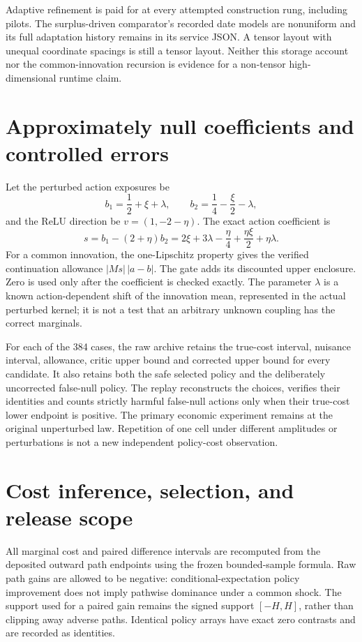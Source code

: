 Adaptive refinement is paid for at every attempted construction rung, including pilots. The surplus-driven comparator's recorded date models are nonuniform and its full adaptation history remains in its service JSON. A tensor layout with unequal coordinate spacings is still a tensor layout. Neither this storage account nor the common-innovation recursion is evidence for a non-tensor high-dimensional runtime claim.

\section{Approximately null coefficients and controlled errors}\label{supp:nonnull54}
Let the perturbed action exposures be
\[
 b_1=\frac12+\xi+\lambda,\qquad
 b_2=\frac14-\frac{\xi}{2}-\lambda,
\]
and the ReLU direction be $v=(1,-2-\eta)$. The exact action coefficient is
\[
 s=b_1-(2+\eta)b_2
   =2\xi+3\lambda-\frac{\eta}{4}
       +\frac{\eta\xi}{2}+\eta\lambda.
\]
For a common innovation, the one-Lipschitz property gives the verified continuation allowance $|Ms|\,|a-b|$. The gate adds its discounted upper enclosure. Zero is used only after the coefficient is checked exactly. The parameter $\lambda$ is a known action-dependent shift of the innovation mean, represented in the actual perturbed kernel; it is not a test that an arbitrary unknown coupling has the correct marginals.

For each of the 384 cases, the raw archive retains the true-cost interval, nuisance interval, allowance, critic upper bound and corrected upper bound for every candidate. It also retains both the safe selected policy and the deliberately uncorrected false-null policy. The replay reconstructs the choices, verifies their identities and counts strictly harmful false-null actions only when their true-cost lower endpoint is positive. The primary economic experiment remains at the original unperturbed law. Repetition of one cell under different amplitudes or perturbations is not a new independent policy-cost observation.

\section{Cost inference, selection, and release scope}\label{supp:inference54}
All marginal cost and paired difference intervals are recomputed from the deposited outward path endpoints using the frozen bounded-sample formula. Raw path gains are allowed to be negative: conditional-expectation policy improvement does not imply pathwise dominance under a common shock. The support used for a paired gain remains the signed support $[-H,H]$, rather than clipping away adverse paths. Identical policy arrays have exact zero contrasts and are recorded as identities.

